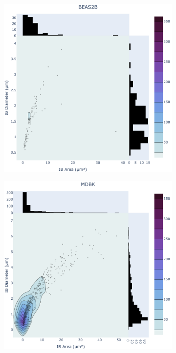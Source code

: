 \begin{figure}
    \medskip
    \begin{subfigure}{0.5\textwidth}
        \caption{}
        \includegraphics[width=\textwidth]{09. Chapter 4/Figs/01. Localisation introduction/04. heatmap_beas2b.pdf} 
    \end{subfigure}
    \hfill
    \begin{subfigure}{0.5\textwidth}
        \caption{}
        \includegraphics[width=\textwidth]{09. Chapter 4/Figs/01. Localisation introduction/05. heatmap_mdbk.pdf} 
    \end{subfigure}
    

\end{figure}
